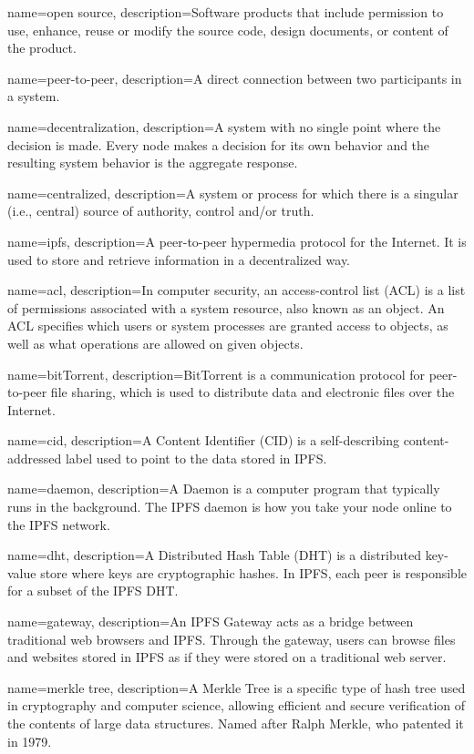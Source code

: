  {
	name=open source,
	description={Software products that include permission to use, enhance, reuse or modify the source code, design documents, or content of the product.}
}

 {
	name=peer-to-peer,
	description={A direct connection between two participants in a system.}
}

 {
	name=decentralization,
	description={A system with no single point where the decision is made. Every node makes a decision for its own behavior and the resulting system behavior is the aggregate response.}
}

 {
	name=centralized,
	description={A system or process for which there is a singular (i.e., central) source of authority, control and/or truth.}
}


 {
	name=ipfs,
	description={A peer-to-peer hypermedia protocol for the Internet. It is used to store and retrieve information in a decentralized way.}
}

 {
	name=acl,
	description={In computer security, an access-control list (ACL) is a list of permissions associated with a system resource, also known as an object. An ACL specifies which users or system processes are granted access to objects, as well as what operations are allowed on given objects.}
}

 {
	name=bitTorrent,
	description={BitTorrent is a communication protocol for peer-to-peer file sharing, which is used to distribute data and electronic files over the Internet.}
}

 {
	name=cid,
	description={A Content Identifier (CID) is a self-describing content-addressed label used to point to the data stored in IPFS.}
}

 {
	name=daemon,
	description={A Daemon is a computer program that typically runs in the background. The IPFS daemon is how you take your node online to the IPFS network.}
}

 {
	name=dht,
	description={A Distributed Hash Table (DHT) is a distributed key-value store where keys are cryptographic hashes. In IPFS, each peer is responsible for a subset of the IPFS DHT.}
}

 {
	name=gateway,
	description={An IPFS Gateway acts as a bridge between traditional web browsers and IPFS. Through the gateway, users can browse files and websites stored in IPFS as if they were stored on a traditional web server.}
}

 {
	name=merkle tree,
	description={A Merkle Tree is a specific type of hash tree used in cryptography and computer science, allowing efficient and secure verification of the contents of large data structures. Named after Ralph Merkle, who patented it in 1979.}
}
